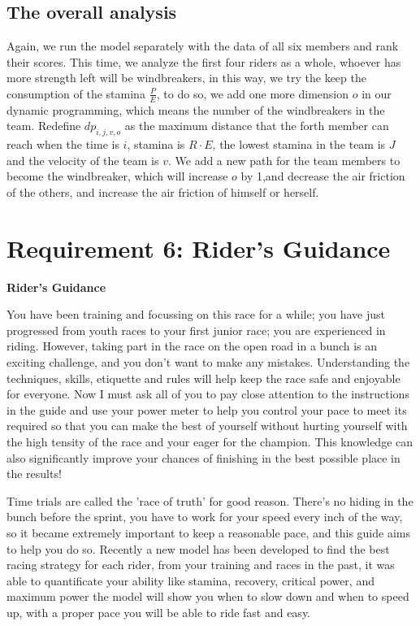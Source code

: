 \documentclass[12pt]{article}
\begin{document}
\subsection{The overall analysis}
Again, we run the model separately with the data of all six members and rank their scores. This time, we analyze the first four riders as a whole, whoever has more strength
left will be windbreakers, in this way, we try the keep the consumption of the stamina $\frac{P}{E}$, to do so, we add one more dimension $o$ in our dynamic programming, which
means the number of the windbreakers in the team. Redefine $dp_{i,j,v,o}$ as the maximum distance that the forth member can reach when the time is $i$, stamina is $R\cdot E$,
the lowest stamina in the team is $J$ and the velocity of the team is $v$. We add a new path for the team members to become the windbreaker, which will increase $o$ by 1,and
decrease the air friction of the others, and increase the air friction of himself or herself.


\section{Requirement 6: Rider's Guidance}
\begin{center}
    \huge \textbf{Rider's Guidance}
\end{center}\large
You have been training and focussing on this race for a while; you  have just progressed from youth races to your first junior race; you are experienced in riding.
However, taking part in the race on the open road in a bunch is an exciting challenge, and you don't want to make any mistakes.
Understanding the techniques, skills, etiquette and rules will help keep the race safe and enjoyable for everyone. Now I must ask all of you to pay close attention to the instructions in the guide and use your power meter
to help you control your pace to meet its required so that you can make the best of yourself without hurting yourself with the high tensity of the race and your eager for
the champion. This knowledge can also significantly improve your chances of finishing in the best possible place in the results!

Time trials are called the 'race of truth' for good reason. There's no hiding in the bunch before the sprint, you have to work for your speed every inch of the way, so it
became extremely important to keep a reasonable pace, and this guide aims to help you do so.
Recently a new model has been developed to find the best racing strategy for each rider, from your training and races in the past, it was able to quantificate your ability
like stamina, recovery, critical power, and maximum power the model will show you when to slow down and when to speed up, with a proper pace you will be able to ride
fast and easy.
\end{document}
